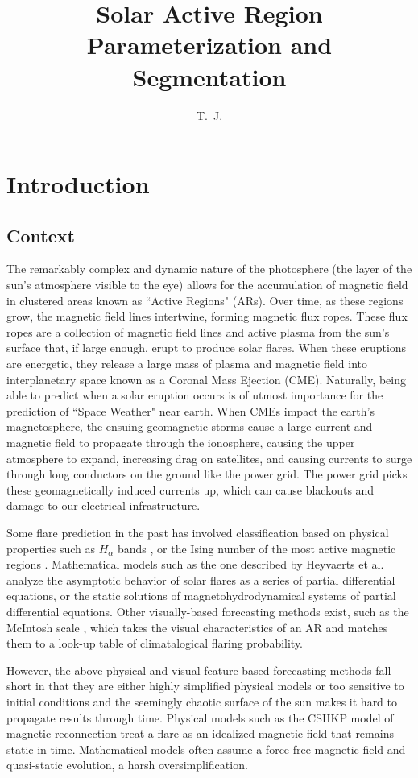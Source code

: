 \documentclass[defaultstyle,11pt]{thesis}
\title{Solar Active Region Parameterization and Segmentation}
\author{T.~J.}{Lincke}
\begin{document}


\chapter{Introduction}
\label{chp:introduction}

\section{Context}
The remarkably complex and dynamic nature of the photosphere (the layer of the sun's atmosphere visible to the eye) allows for the accumulation of magnetic field in clustered areas known as ``Active Regions" (ARs). Over time, as these regions grow, the magnetic field lines intertwine, forming magnetic flux ropes. These flux ropes are a collection of magnetic field lines and active plasma from the sun's surface that, if large enough, erupt to produce solar flares. When these eruptions are energetic, they release a large mass of plasma and magnetic field into interplanetary space known as a Coronal Mass Ejection (CME). Naturally, being able to predict when a solar eruption occurs is of utmost importance for the prediction of ``Space Weather" near earth. When CMEs impact the earth's magnetosphere, the ensuing geomagnetic storms cause a large current and magnetic field to propagate through the ionosphere, causing the upper atmosphere to expand, increasing drag on satellites, and causing currents to surge through long conductors on the ground like the power grid. The power grid picks these geomagnetically induced currents up, which can cause blackouts and damage to our electrical infrastructure. 

Some flare prediction in the past has involved classification based on physical properties such as $H_{\alpha}$ bands \cite{hale_magnetic_1919}, or the Ising number of the most active magnetic regions \cite{MCintosh}. Mathematical models such as the one described by Heyvaerts et al. \cite{heyvaerts_mathematical_1983} analyze the asymptotic behavior of solar flares as a series of partial differential equations, or the static solutions of magnetohydrodynamical systems of partial differential equations. Other visually-based forecasting methods exist, such as the McIntosh scale \cite{MCintosh}, which takes the visual characteristics of an AR and matches them to a look-up table of climatalogical flaring probability.

However, the above physical and visual feature-based forecasting methods fall short in that they are either highly simplified physical models or too sensitive to initial conditions and the seemingly chaotic surface of the sun makes it hard to propagate results through time. Physical models such as the CSHKP model \cite{choudhary_strassmeier_2011} of magnetic reconnection treat a flare as an idealized magnetic field that remains static in time. Mathematical models often assume a force-free magnetic field and quasi-static evolution, a harsh oversimplification.
\end{document}
